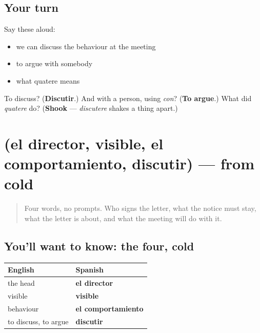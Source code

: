 \subsection*{Your turn}
Say these aloud:

\begin{itemize}
\raggedright
  \item we can discuss the behaviour at the meeting
  \item to argue with somebody
  \item what quatere means
\end{itemize}

\begin{tcolorbox}[breakable,colback=teal!4,colframe=teal!35!black,title={Before you move on}]
To discuss? (\textbf{Discutir}.) And with a person, using \emph{con}? (\textbf{To argue}.) What did \emph{quatere} do? (\textbf{Shook} — \emph{discutere} shakes a thing apart.)
\end{tcolorbox}
\section[(el director, visible, el …]{(el director, visible, el comportamiento, discutir) — from cold}

\label{lesson:ES-R466-repaso-informe}



\begin{quote}
Four words, no prompts. Who signs the letter, what the notice must stay, what the letter is about, and what the meeting will do with it.
\end{quote}

\subsection*{You'll want to know: the four, cold}
\noindent
\begin{tabularx}{\linewidth}{@{}>{\raggedright\arraybackslash}X>{\raggedright\arraybackslash}X@{}}
\toprule
\textbf{English} & \textbf{Spanish} \\
\midrule
the head & \textbf{el director} \\
visible & \textbf{visible} \\
behaviour & \textbf{el comportamiento} \\
to discuss, to argue & \textbf{discutir} \\
\bottomrule
\end{tabularx}

